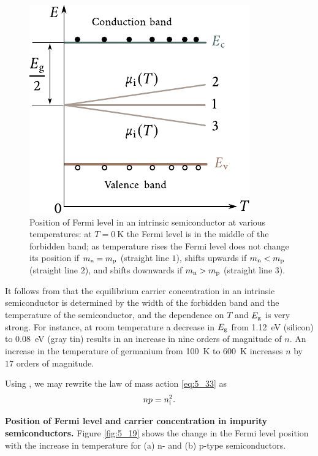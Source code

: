 \begin{figure}[t]
	\begin{center}
		\includegraphics[scale=1]{figures/ch_05/fig_5_18.pdf}
		\caption[]{Position of Fermi level in an intrinsic semiconductor at various temperatures: at $T=\SI{0}{\kelvin}$ the Fermi level is in the middle of the forbidden band; as temperature rises the Fermi level does not change its position if $m_{\text{n}}=m_{\text{p}}$ (straight line $1$), shifts upwards if $m_{\text{n}}<m_{\text{p}}$ (straight line $2$), and shifts downwards if $m_{\text{n}}>m_{\text{p}}$ (straight line $3$).}
		\label{fig:5_18}
	\end{center}
	\vspace{-0.7cm}
\end{figure}

It follows from  that the equilibrium carrier concentration in an intrinsic semiconductor is determined by the width of the forbidden band and the temperature of the semiconductor, and the dependence on $T$ and $E_{\text{g}}$ is very strong. For instance, at room temperature a decrease in $E_{\text{g}}$ from \SI{1.12}{\electronvolt} (silicon) to \SI{0.08}{\electronvolt} (gray tin) results in an increase in nine orders of magnitude of $n$. An increase
in the temperature of germanium from \SI{100}{\kelvin} to \SI{600}{\kelvin} increases $n$ by $17$ orders of magnitude.

Using , we may rewrite the law of mass action \eqref{eq:5_33} as
\begin{equation}\label{eq:5_38}
    np = n_{\text{i}}^2.
\end{equation}

\textbf{Position of Fermi level and carrier concentration in impurity semiconductors.} Figure \ref{fig:5_19} shows the change in the Fermi level position with the increase in temperature for (a) n- and (b) p-type semiconductors.

